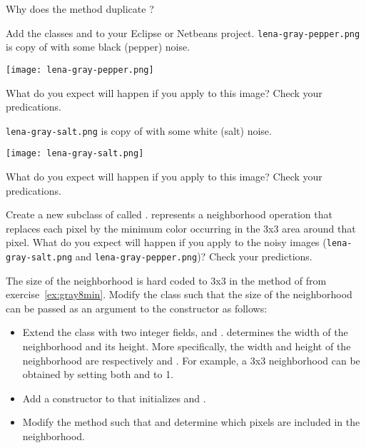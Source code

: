 \documentclass{book}
\begin{document}
\begin{exercise}
Why does the method  duplicate ?
\end{exercise}

\begin{exercise}\label{ex:gray8max}
Add the classes  and  to your Eclipse or Netbeans project. \texttt{lena-gray-pepper.png} is copy of  with some black (pepper) noise.
\begin{center}
\texttt{[image: lena-gray-pepper.png]}
\end{center}
What do you expect will happen if you apply  to this image? Check your predications. 

\texttt{lena-gray-salt.png} is copy of  with some white (salt) noise. 
\begin{center}
\texttt{[image: lena-gray-salt.png]}
\end{center}
What do you expect will happen if you apply  to this image? Check your predications. 
\end{exercise}

\begin{exercise}\label{ex:gray8min}
Create a new subclass of  called .  represents a neighborhood operation that replaces each pixel by the minimum color occurring in the 3x3 area around that pixel. What do you expect will happen if you apply  to the noisy images (\texttt{lena-gray-salt.png} and \texttt{lena-gray-pepper.png})? Check your predictions. 
\end{exercise}

\begin{exercise}
The size of the neighborhood is hard coded to 3x3 in the method  of  from exercise~\ref{ex:gray8min}. Modify the class  such that the size of the neighborhood can be passed as an argument to the constructor as follows:
\begin{itemize}
  \item Extend the class  with two integer fields,  and .  determines the width of the neighborhood and  its height. More specifically, the width and height of the neighborhood are respectively  and . For example, a 3x3 neighborhood can be obtained by setting both  and  to 1. %
  \item Add a constructor to  that initializes  and . 
  \item Modify the method  such that  and  determine which pixels are included in the neighborhood. 
\end{itemize}
\end{exercise}
\end{document}

